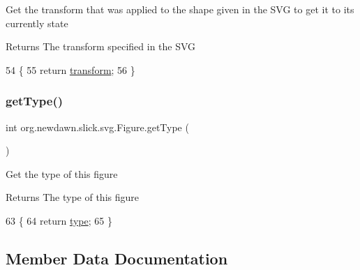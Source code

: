 Get the transform that was applied to the shape given in the S\+VG to get it to it\textquotesingle{}s currently state

\begin{DoxyReturn}{Returns}
The transform specified in the S\+VG 
\end{DoxyReturn}

\begin{DoxyCode}
54                                     \{
55         \textcolor{keywordflow}{return} \mbox{\hyperlink{classorg_1_1newdawn_1_1slick_1_1svg_1_1_figure_a026c30ce2ef9b710c6bd51ff60c0b887}{transform}};
56     \}
\end{DoxyCode}
\mbox{\label{classorg_1_1newdawn_1_1slick_1_1svg_1_1_figure_aa5ea3e073ecdf374f07b9cd4a140ef88}} 
\subsubsection{\texorpdfstring{get\+Type()}{getType()}}
{\footnotesize\ttfamily int org.\+newdawn.\+slick.\+svg.\+Figure.\+get\+Type (\begin{DoxyParamCaption}{ }\end{DoxyParamCaption})\hspace{0.3cm}{\ttfamily [inline]}}

Get the type of this figure

\begin{DoxyReturn}{Returns}
The type of this figure 
\end{DoxyReturn}

\begin{DoxyCode}
63                          \{
64         \textcolor{keywordflow}{return} \mbox{\hyperlink{classorg_1_1newdawn_1_1slick_1_1svg_1_1_figure_a13aa6b5f3b570fcdd83fa792c4df142b}{type}};
65     \}
\end{DoxyCode}


\subsection{Member Data Documentation}
\mbox{\label{classorg_1_1newdawn_1_1slick_1_1svg_1_1_figure_a31e90c8351882640950687c7e8587091}} 
